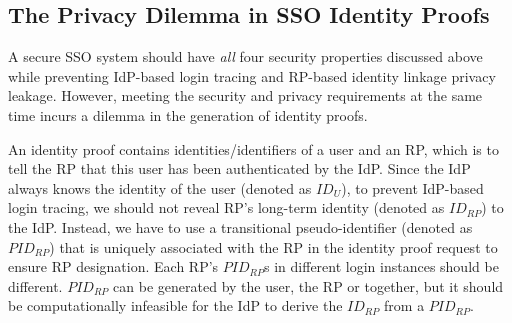 \subsection{The Privacy Dilemma in SSO Identity Proofs}
\label{subsec:challenges}

A secure SSO system should have {\em all} four security properties discussed above while preventing IdP-based login tracing and RP-based identity linkage privacy leakage. However, meeting the security and privacy requirements at the same time incurs a dilemma in the generation of identity proofs.

An identity proof contains identities/identifiers of a user and an RP, which is to tell the RP that this user has been authenticated by the IdP.
Since the IdP always knows the identity of the user (denoted as $ID_U$), to prevent IdP-based login tracing, we should not reveal RP's long-term identity (denoted as $ID_{RP}$) to the IdP. Instead, we have to use a transitional pseudo-identifier (denoted as $PID_{RP}$) that is uniquely associated with the RP in the identity proof request to ensure RP designation. Each RP's $PID_{RP}$s in different login instances should be different. $PID_{RP}$ can be generated by the user, the RP or together, but it should be computationally infeasible for the IdP to derive the $ID_{RP}$ from a $PID_{RP}$.

